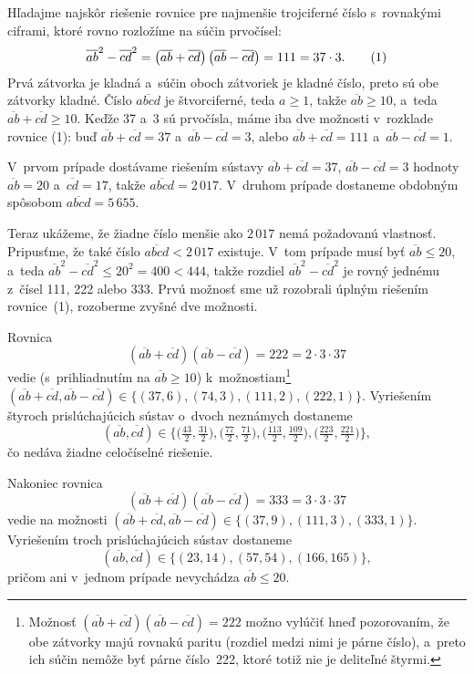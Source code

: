 {%
Hľadajme najskôr riešenie rovnice pre najmenšie trojciferné číslo
s~rovnakými ciframi, ktoré rovno rozložíme na súčin prvočísel:
$$
\overline {ab}^2- \overline {cd}^2
= \left (\overline {ab}+\overline {cd} \right) \left (\overline {ab}-\overline {cd} \right)
= 111= 37 \cdot3 .
\tag1
$$
Prvá zátvorka je kladná a~súčin oboch zátvoriek je kladné číslo, preto
sú obe zátvorky kladné. Číslo $\overline {abcd}$ je štvorciferné, teda
$a\ge 1$, takže $\overline {ab} \ge 10$, a~teda
$\overline {ab}+\overline {cd} \ge 10$. Keďže 37 a~3 sú prvočísla,
máme iba dve možnosti v~rozklade rovnice (1): buď
$\overline {ab}+\overline {cd} = 37$ a~$\overline {ab}-\overline {cd} = 3$,
alebo $\overline {ab}+\overline {cd} = 111$
a~$\overline {ab}-\overline {cd} = 1$.

V~prvom prípade dostávame riešením sústavy $\overline {ab}+\overline {cd} = 37$,
$\overline {ab}-\overline {cd} = 3$ hodnoty $\overline {ab} = 20$
a~$\overline {cd} = 17$, takže $\overline {abcd} = 2\,017$. V~druhom prípade
dostaneme obdobným spôsobom $\overline {abcd} = 5\,655$.

Teraz ukážeme, že žiadne číslo menšie ako $2\,017$ nemá požadovanú
vlastnosť. Pripusťme, že také číslo $\overline {abcd} <2\,017$
existuje. V~tom prípade musí byť $\overline {ab} \le 20$, a~teda
$\overline {ab}^2- \overline {cd}^2 \le 20^2= 400 <444$, takže
rozdiel $\overline {ab}^2- \overline {cd}^2$ je rovný
jednému z~čísel 111, 222 alebo 333. Prvú možnosť sme už rozobrali úplným
riešením rovnice~(1), rozoberme zvyšné dve možnosti.

Rovnica
$$
\left (\overline {ab}+\overline {cd} \right) \left (\overline {ab}-\overline {cd} \right)
= 222 = 2 \cdot3 \cdot 37
$$
vedie (s~prihliadnutím na $\overline {ab} \ge 10$) k~možnostiam\footnote{Možnosť
$(\overline {ab}+\overline {cd}) (\overline {ab}-\overline {cd}) = 222$
možno vylúčiť hneď pozorovaním, že obe zátvorky majú rovnakú paritu
(rozdiel medzi nimi je párne číslo), a~preto ich súčin nemôže byť párne
číslo~222, ktoré totiž nie je deliteľné štyrmi.}
$\left (\overline {ab}+\overline {cd}, \overline {ab}-\overline {cd} \right)
\in \{(37,6), (74,3),\allowbreak (111,2), (222,1)\}$. Vyriešením štyroch
prislúchajúcich sústav o~dvoch neznámych dostaneme
$$
\left (\overline {ab}, \overline {cd} \right)\in
\bigl\{
\big(\tfrac {43} 2, \tfrac {31} 2 \big),
\big(\tfrac {77} 2, \tfrac {71} 2 \big),
\big(\tfrac {113}2, \tfrac {109}2 \big),
\big(\tfrac {223}2, \tfrac {221}2 \big) \bigr\},
$$
čo nedáva žiadne celočíselné riešenie.

Nakoniec rovnica
$$
\left (\overline {ab}+\overline {cd} \right)
\left (\overline {ab}-\overline {cd} \right) = 333 = 3 \cdot3 \cdot 37
$$
vedie na možnosti
$\left (\overline {ab}+\overline {cd}, \overline {ab}-\overline {cd} \right)
\in \{(37,9), (111,3), (333,1)\}$.
Vyriešením troch prislúchajúcich sústav dostaneme
$$
\left (\overline {ab}, \overline {cd} \right) \in\{(23, 14), (57, 54), (166, 165)\},
$$
pričom ani v~jednom prípade nevychádza $\overline {ab}\le 20$.

}
